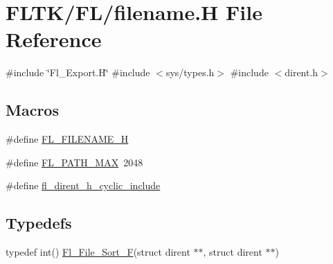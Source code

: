 \hypertarget{filename_8_h}{}\section{F\+L\+T\+K/\+F\+L/filename.H File Reference}
\label{filename_8_h}
{\ttfamily \#include \char`\"{}Fl\+\_\+\+Export.\+H\char`\"{}}\newline
{\ttfamily \#include $<$sys/types.\+h$>$}\newline
{\ttfamily \#include $<$dirent.\+h$>$}\newline
\subsection*{Macros}
\begin{DoxyCompactItemize}
\item 
\#define \hyperlink{filename_8_h_a397ec8b8e50e52d9b1aea1de504d636b}{F\+L\+\_\+\+F\+I\+L\+E\+N\+A\+M\+E\+\_\+H}
\item 
\#define \hyperlink{group__filenames_ga29253083ed9918c2f9d532bd5ed89cc3}{F\+L\+\_\+\+P\+A\+T\+H\+\_\+\+M\+AX}~2048
\item 
\#define \hyperlink{group__filenames_ga611853809ad3600822556b6c9f5b3232}{fl\+\_\+dirent\+\_\+h\+\_\+cyclic\+\_\+include}
\end{DoxyCompactItemize}
\subsection*{Typedefs}
\begin{DoxyCompactItemize}
\item 
typedef int() \hyperlink{group__filenames_gaaf6f4a54bb593dcf326fc5d12bb1435c}{Fl\+\_\+\+File\+\_\+\+Sort\+\_\+F}(struct dirent $\ast$$\ast$, struct dirent $\ast$$\ast$)
\end{DoxyCompactItemize}
